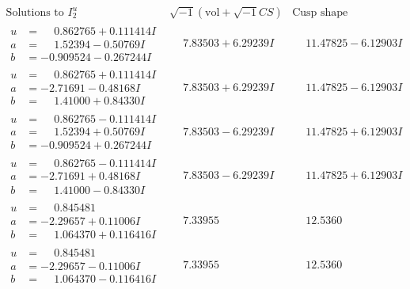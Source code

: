 \documentclass[1p]{elsarticle_modified}
\theoremstyle{definition}
\newcommand{\I}{\sqrt{-1}}
\begin{document}
$$\begin{array}{c|c|c}  
\text{Solutions to }I^u_{2}& \I (\text{vol} + \sqrt{-1}CS) & \text{Cusp shape}\\
 \hline 
\begin{aligned}
u &= \phantom{-}0.862765 + 0.111414 I \\
a &= \phantom{-}1.52394 - 0.50769 I \\
b &= -0.909524 - 0.267244 I\end{aligned}
 & \phantom{-}7.83503 + 6.29239 I & \phantom{-}11.47825 - 6.12903 I \\ \hline\begin{aligned}
u &= \phantom{-}0.862765 + 0.111414 I \\
a &= -2.71691 - 0.48168 I \\
b &= \phantom{-}1.41000 + 0.84330 I\end{aligned}
 & \phantom{-}7.83503 + 6.29239 I & \phantom{-}11.47825 - 6.12903 I \\ \hline\begin{aligned}
u &= \phantom{-}0.862765 - 0.111414 I \\
a &= \phantom{-}1.52394 + 0.50769 I \\
b &= -0.909524 + 0.267244 I\end{aligned}
 & \phantom{-}7.83503 - 6.29239 I & \phantom{-}11.47825 + 6.12903 I \\ \hline\begin{aligned}
u &= \phantom{-}0.862765 - 0.111414 I \\
a &= -2.71691 + 0.48168 I \\
b &= \phantom{-}1.41000 - 0.84330 I\end{aligned}
 & \phantom{-}7.83503 - 6.29239 I & \phantom{-}11.47825 + 6.12903 I \\ \hline\begin{aligned}
u &= \phantom{-}0.845481\phantom{ +0.000000I} \\
a &= -2.29657 + 0.11006 I \\
b &= \phantom{-}1.064370 + 0.116416 I\end{aligned}
 & \phantom{-}7.33955\phantom{ +0.000000I} & \phantom{-}12.5360\phantom{ +0.000000I} \\ \hline\begin{aligned}
u &= \phantom{-}0.845481\phantom{ +0.000000I} \\
a &= -2.29657 - 0.11006 I \\
b &= \phantom{-}1.064370 - 0.116416 I\end{aligned}
 & \phantom{-}7.33955\phantom{ +0.000000I} & \phantom{-}12.5360\phantom{ +0.000000I} \\ \hline\begin{aligned}

\end{aligned}
\end{array}$$
\end{document}
